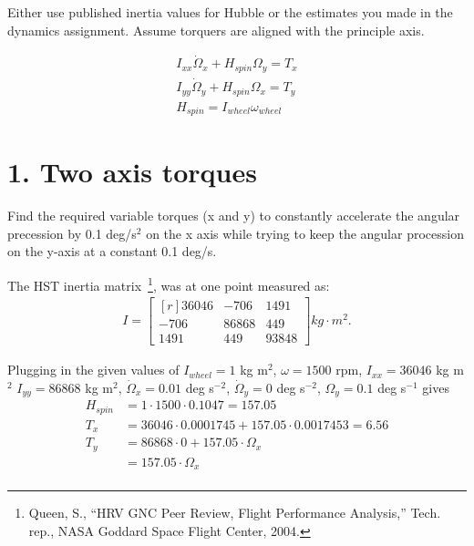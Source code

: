 \documentclass[onecolumn,10pt]{jhwhw}
\begin{document}
\clearpage
{}
Either use published inertia values for Hubble or the estimates you made in the dynamics assignment. Assume torquers are aligned with the principle axis.

\begin{align*}
I_{xx}\dot{\Omega}_{x} + H_{spin}\Omega_y = T_x \\
I_{yy}\dot{\Omega}_{y} + H_{spin}\Omega_x = T_y \\
H_{spin} = I_{wheel} \omega_{wheel}
\end{align*}

\part{1. Two axis torques}
Find the required variable torques (x and y) to constantly accelerate the angular precession by 0.1 deg/s$^2$ on the x axis while trying to keep the angular procession on the y-axis at a constant 0.1 deg/s.

The HST inertia matrix~\footnote{Queen, S., ``HRV GNC Peer Review, Flight Performance Analysis,'' Tech. rep., NASA Goddard Space Flight Center, 2004.}, was at one point measured as:
\begin{align*}
I =
\begin{bmatrix*}[r]
    36046       & -706  &  1491 \\
    -706        & 86868 &   449 \\
    1491        & 449   & 93848
\end{bmatrix*}
kg \cdot m^2.
\end{align*}

Plugging in the given values of $I_{wheel} = 1$ kg m$^2$, $\omega = 1500$ rpm, $I_{xx} = 36046$ kg m$^2$ $I_{yy} = 86868$ kg m$^2$, $\dot{\Omega}_x = 0.01$ deg s$^{-2}$, $\dot{\Omega}_y = 0$ deg s$^{-2}$, $\Omega_y = 0.1$ deg s$^{-1}$ gives
\begin{align*}
H_{spin} &= 1 \cdot 1500 \cdot 0.1047 = 157.05 \\
T_x &= 36046 \cdot 0.0001745 + 157.05 \cdot 0.0017453 = 6.56\\
T_y &= 86868 \cdot 0         + 157.05 \cdot \Omega_x \\
    &= 157.05 \cdot \Omega_x \\
\end{align*}
\end{document}
